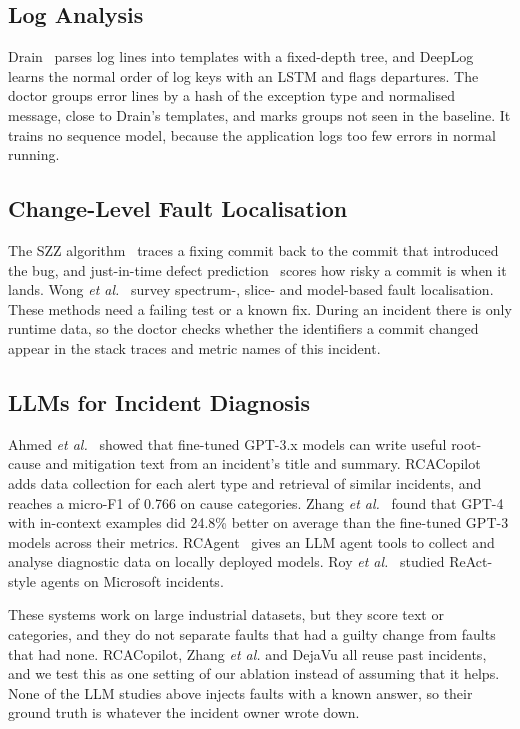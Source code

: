 \documentclass[12pt,onecolumn,draftclsnofoot]{IEEEtran}
\begin{document}
\subsection{Log Analysis}
Drain~\cite{he2017drain} parses log lines into templates with a fixed-depth tree, and DeepLog~\cite{du2017deeplog} learns the normal order of log keys with an LSTM and flags departures. The doctor groups error lines by a hash of the exception type and normalised message, close to Drain's templates, and marks groups not seen in the baseline. It trains no sequence model, because the application logs too few errors in normal running.

\subsection{Change-Level Fault Localisation}
The SZZ algorithm~\cite{sliwerski2005szz} traces a fixing commit back to the commit that introduced the bug, and just-in-time defect prediction~\cite{kamei2013jit} scores how risky a commit is when it lands. Wong \emph{et al.}~\cite{wong2016survey} survey spectrum-, slice- and model-based fault localisation. These methods need a failing test or a known fix. During an incident there is only runtime data, so the doctor checks whether the identifiers a commit changed appear in the stack traces and metric names of this incident.

\subsection{LLMs for Incident Diagnosis}
Ahmed \emph{et al.}~\cite{ahmed2023recommending} showed that fine-tuned GPT-3.x models can write useful root-cause and mitigation text from an incident's title and summary. RCACopilot~\cite{chen2024rcacopilot} adds data collection for each alert type and retrieval of similar incidents, and reaches a micro-F1 of 0.766 on cause categories. Zhang \emph{et al.}~\cite{zhang2024icl} found that GPT-4 with in-context examples did 24.8\% better on average than the fine-tuned GPT-3 models across their metrics. RCAgent~\cite{wang2024rcagent} gives an LLM agent tools to collect and analyse diagnostic data on locally deployed models. Roy \emph{et al.}~\cite{roy2024agents} studied ReAct-style agents on Microsoft incidents.

These systems work on large industrial datasets, but they score text or categories, and they do not separate faults that had a guilty change from faults that had none. RCACopilot, Zhang \emph{et al.} and DejaVu all reuse past incidents, and we test this as one setting of our ablation instead of assuming that it helps. None of the LLM studies above injects faults with a known answer, so their ground truth is whatever the incident owner wrote down.
\end{document}
